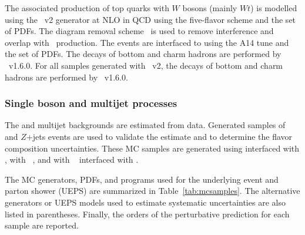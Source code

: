 The associated production of top quarks with $W$ bosons (mainly $Wt$) is modelled using the \powhegbox~v2 generator at NLO in QCD using the five-flavor scheme and the \nnpdfnlo set of PDFs.
The diagram removal scheme~\cite{Frixione:2008yi} is used to remove interference and overlap with \ttbar\ production.
The events are interfaced to  using the A14 tune and the \nnpdftwo set of PDFs.
The decays of bottom and charm hadrons are performed by \evtgen~v1.6.0.
For all samples generated with \powhegbox~v2, the decays of bottom and charm hadrons are performed by \evtgen~v1.6.0.

\subsubsection{Single boson and multijet processes}

The \Wjets and multijet backgrounds are estimated from data. Generated samples of \Wjets and $Z$+jets events are used to validate the estimate and to determine the flavor composition uncertainties. These MC samples are generated using \POWHEG interfaced with , with ~\cite{Bothmann:2019yzt}, and with \MGFiveNLO~\cite{Alwall:2014hca,Frederix:2012ps} interfaced with .

The MC generators, PDFs, and programs used for the underlying event and parton shower (UEPS) are summarized in Table~\ref{tab:mcsamples}.
The alternative generators or UEPS models used to estimate systematic uncertainties are also listed in parentheses.
Finally, the orders of the perturbative prediction for each sample are reported.



